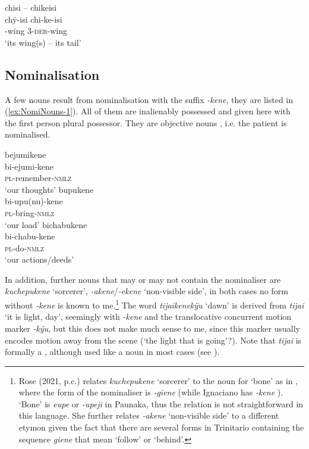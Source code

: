 \ea\label{ex:ke-deriv-animal}
\begingl 
\glpreamble chisi – chikeisi\\
\gla chÿ-isi chi-ke-isi\\ 
-wing 3-\textsc{der}-wing\\ 
\glft ‘its wing(s) – its tail’\\ 
\endgl
\xe


\subsection{Nominalisation}\label{sec:MorphologyNominalisation}

A few nouns result from nominalisation with the suffix \textit{-kene}, they are listed in (\ref{ex:NomiNouns-1}). All of them are inalienably possessed and given here with the first person plural possessor. They are objective nouns \citep[cf.][]{ComrieThompson2007}, i.e. the patient is nominalised.


\ea\label{ex:NomiNouns-1}
  \ea\label{ex:NomiNouns-1.1}
\begingl
\glpreamble bejumikene\\
\gla bi-ejumi-kene\\
\textsc{pl}-remember-\textsc{nmlz}\\
\glft ‘our thoughts’
\endgl
  \ex\label{ex:NomiNouns-1.2}
\begingl
\glpreamble bupukene\\
\gla bi-upu(nu)-kene\\
\textsc{pl}-bring-\textsc{nmlz}\\
\glft ‘our load’
\endgl
  \ex\label{ex:NomiNouns-1.3}
\begingl
\glpreamble bichabukene\\
\gla bi-chabu-kene\\
\textsc{pl}-do-\textsc{nmlz}\\
\glft ‘our actions/deeds’
\endgl
\z
\xe

In addition, further nouns that may or may not contain the nominaliser are \textit{kuchepukene} ‘sorcerer’, \textit{-akene}/\textit{-ekene} ‘non-visible side’, in both cases no form without \textit{-kene} is known to me.\footnote{Rose (2021, p.c.) relates \textit{kuchepukene} ‘sorcerer’ to the noun for ‘bone’ as in , where the form of the nominaliser is \textit{-giene} (while Ignaciano has \textit{-kene} \citep[cf.][663--672]{OlzaZubiri2004}). ‘Bone’ is \textit{eupe} or \textit{-upeji} in Paunaka, thus the relation is not straightforward in this language. She further relates \textit{-akene} ‘non-visible side’ to a different etymon given the fact that there are several forms in Trinitario containing the sequence \textit{giene} that mean ‘follow’ or ‘behind’.} The word \textit{tijaikenekÿu} ‘dawn’ is derived from \textit{tijai} ‘it is light, day’, seemingly with \textit{-kene} and the translocative concurrent motion marker \textit{-kÿu}, but this does not make much sense to me, since this marker usually encodes motion away from the scene (‘the light that is going’?). Note that \textit{tijai} is formally a , although used like a noun in most cases (see ).

